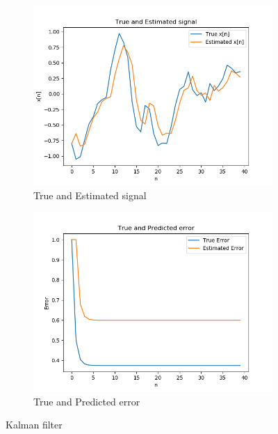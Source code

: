 \documentclass[a4 paper]{article}
\begin{document}
\begin{figure}[h]
	\centering
	\begin{subfigure}{.5\textwidth}
		\centering
		\includegraphics[width=1\linewidth]{../results/Kalman_1.png}
		\caption{True and Estimated signal}
		\label{fig:kalman_1}
	\end{subfigure}%
	\begin{subfigure}{.5\textwidth}
		\centering
		\includegraphics[width=1\linewidth]{../results/Kalman_2.png}
		\caption{True and Predicted error}
		\label{fig:kalman_2}
	\end{subfigure}
	\caption{Kalman filter}
	\label{fig:kalman}
\end{figure}
\end{document}
